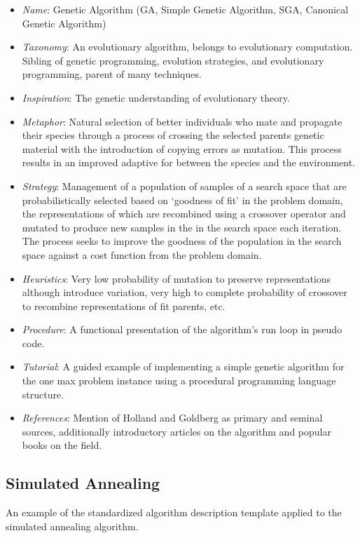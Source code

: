 \documentclass[a4paper, 11pt]{article}
\begin{document}
\begin{itemize}
	\item \emph{Name}: Genetic Algorithm (GA, Simple Genetic Algorithm, SGA, Canonical Genetic Algorithm)
	\item \emph{Taxonomy}: An evolutionary algorithm, belongs to evolutionary computation. Sibling of genetic programming, evolution strategies, and evolutionary programming, parent of many techniques.
	\item \emph{Inspiration}: The genetic understanding of evolutionary theory. 
	\item \emph{Metaphor}: Natural selection of better individuals who mate and propagate their species through a process of crossing the selected parents genetic material with the introduction of copying errors as mutation. This process results in an improved adaptive for between the species and the environment.
	\item \emph{Strategy}: Management of a population of samples of a search space that are probabilistically selected based on `goodness of fit' in the problem domain, the representations of which are recombined using a crossover operator and mutated to produce new samples in the in the search space each iteration. The process seeks to improve the goodness of the population in the search space against a cost function from the problem domain.
	\item \emph{Heuristics}: Very low probability of mutation to preserve representations although introduce variation, very high to complete probability of crossover to recombine representations of fit parents, etc.
	\item \emph{Procedure}: A functional presentation of the algorithm's run loop in pseudo code.
	\item \emph{Tutorial}: A guided example of implementing a simple genetic algorithm for the one max problem instance using a procedural programming language structure.
	\item \emph{References}: Mention of Holland and Goldberg as primary and seminal sources, additionally introductory articles on the algorithm and popular books on the field.
\end{itemize}

\subsection{Simulated Annealing}
An example of the standardized algorithm description template applied to the simulated annealing algorithm.
\end{document}
